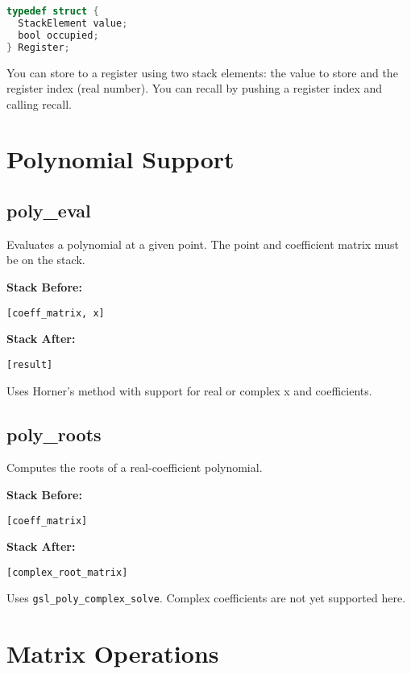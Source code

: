 \documentclass[12pt]{article}
\begin{document}
\begin{lstlisting}[language=C]
typedef struct {
  StackElement value;
  bool occupied;
} Register;
\end{lstlisting}

You can store to a register using two stack elements: the value to store and the register index (real number). You can recall by pushing a register index and calling recall.

\section{Polynomial Support}

\subsection{poly\_eval}

Evaluates a polynomial at a given point. The point and coefficient matrix must be on the stack.

\textbf{Stack Before:}
\begin{verbatim}
[coeff_matrix, x]
\end{verbatim}

\textbf{Stack After:}
\begin{verbatim}
[result]
\end{verbatim}

Uses Horner's method with support for real or complex x and coefficients.

\subsection{poly\_roots}

Computes the roots of a real-coefficient polynomial.

\textbf{Stack Before:}
\begin{verbatim}
[coeff_matrix]
\end{verbatim}

\textbf{Stack After:}
\begin{verbatim}
[complex_root_matrix]
\end{verbatim}

Uses \texttt{gsl\_poly\_complex\_solve}. Complex coefficients are not yet supported here.

\section{Matrix Operations}
\end{document}

